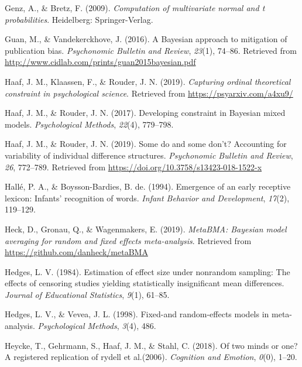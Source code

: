 \documentclass[english,,man]{apa6}
\begin{document}
\leavevmode\hypertarget{ref-R-mvtnorm}{}%
Genz, A., \& Bretz, F. (2009). \emph{Computation of multivariate normal and t probabilities}. Heidelberg: Springer-Verlag.

\leavevmode\hypertarget{ref-Guan:Vandekerckhove:2016}{}%
Guan, M., \& Vandekerckhove, J. (2016). A Bayesian approach to mitigation of publication bias. \emph{Psychonomic Bulletin and Review}, \emph{23}(1), 74--86. Retrieved from \url{http://www.cidlab.com/prints/guan2015bayesian.pdf}

\leavevmode\hypertarget{ref-Haaf:etal:2019}{}%
Haaf, J. M., Klaassen, F., \& Rouder, J. N. (2019). \emph{Capturing ordinal theoretical constraint in psychological science}. Retrieved from \url{https://psyarxiv.com/a4xu9/}

\leavevmode\hypertarget{ref-Haaf:Rouder:2017}{}%
Haaf, J. M., \& Rouder, J. N. (2017). Developing constraint in Bayesian mixed models. \emph{Psychological Methods}, \emph{22}(4), 779--798.

\leavevmode\hypertarget{ref-Haaf:Rouder:2019}{}%
Haaf, J. M., \& Rouder, J. N. (2019). Some do and some don't? Accounting for variability of individual difference structures. \emph{Psychonomic Bulletin and Review}, \emph{26}, 772--789. Retrieved from \url{https://doi.org/10.3758/s13423-018-1522-x}

\leavevmode\hypertarget{ref-Halle:Boysson:1994}{}%
Hallé, P. A., \& Boysson-Bardies, B. de. (1994). Emergence of an early receptive lexicon: Infants' recognition of words. \emph{Infant Behavior and Development}, \emph{17}(2), 119--129.

\leavevmode\hypertarget{ref-Heck:etal:2019}{}%
Heck, D., Gronau, Q., \& Wagenmakers, E. (2019). \emph{MetaBMA: Bayesian model averaging for random and fixed effects meta-analysis}. Retrieved from \url{https://github.com/danheck/metaBMA}

\leavevmode\hypertarget{ref-Hedges:1984}{}%
Hedges, L. V. (1984). Estimation of effect size under nonrandom sampling: The effects of censoring studies yielding statistically insignificant mean differences. \emph{Journal of Educational Statistics}, \emph{9}(1), 61--85.

\leavevmode\hypertarget{ref-Hedges:Vevea:1998}{}%
Hedges, L. V., \& Vevea, J. L. (1998). Fixed-and random-effects models in meta-analysis. \emph{Psychological Methods}, \emph{3}(4), 486.

\leavevmode\hypertarget{ref-Heycke:etal:2018}{}%
Heycke, T., Gehrmann, S., Haaf, J. M., \& Stahl, C. (2018). Of two minds or one? A registered replication of rydell et al.(2006). \emph{Cognition and Emotion}, \emph{0}(0), 1--20.
\end{document}
